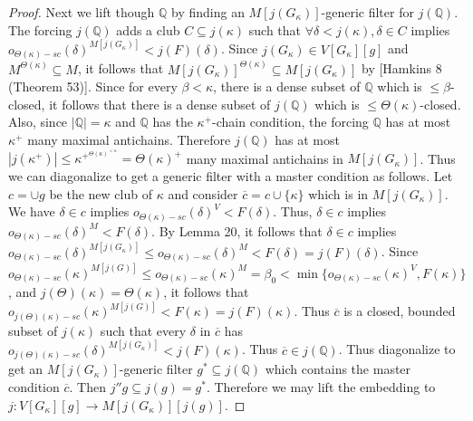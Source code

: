 \documentclass[10pt,a4paper]{amsart}
\begin{document}
\begin{proof}
 Next we lift though $\mathbb{Q}$ by finding an $M[j(G_{\kappa})]$-generic filter for $j(\mathbb{Q})$. The forcing $j(\mathbb{Q})$ adds a club $C \subseteq j(\kappa)$ such that $\forall \delta < j(\kappa), \delta \in C$ implies $o_{\Theta(\kappa)-sc}(\delta)^{M[j(G_{\kappa})]} <j(F)(\delta)$. Since $j(G_{\kappa}) \in V[G_{\kappa}][g]$ and $M^{\Theta(\kappa)} \subseteq M$, it follows that $M[j(G_{\kappa})]^{\Theta(\kappa)} \subseteq M[j(G_{\kappa})]$ by [Hamkins 8 (Theorem 53)]. Since for every $\beta < \kappa$, there is a dense subset of $\mathbb{Q}$ which is $\le \beta$-closed, it follows that there is a dense subset of $j(\mathbb{Q})$ which is $\le \Theta(\kappa)$-closed. Also, since $|\mathbb{Q}| = \kappa$ and $\mathbb{Q}$ has the $\kappa^+$-chain condition, the forcing $\mathbb{Q}$ has at most $\kappa^+$ many maximal antichains. Therefore $j(\mathbb{Q})$ has at most $|j(\kappa^+)| \le \kappa^{+^{\Theta(\kappa)^{<\kappa}}} = \Theta(\kappa)^+$ many maximal antichains in $M[j(G_{\kappa})]$. Thus we can diagonalize to get a generic filter with a master condition as follows. Let $c = \cup g$ be the new club of $\kappa$ and consider $\overline{c} = c \cup \{ \kappa \}$ which is in $M[j(G_{\kappa})]$. We have $\delta \in c$ implies $o_{\Theta(\kappa)-sc}(\delta)^V < F(\delta)$. Thus, $\delta \in c$ implies $o_{\Theta(\kappa)-sc}(\delta)^M < F(\delta)$. By Lemma 20, it follows that $\delta \in c$ implies $o_{\Theta(\kappa)-sc}(\delta)^{M[j(G_{\kappa})]} \le o_{\Theta(\kappa)-sc}(\delta)^M < F(\delta) = j(F)(\delta)$. Since $o_{\Theta(\kappa)-sc}(\kappa)^{M[j(G)]} \le o_{\Theta(\kappa)-sc}(\kappa)^M = \beta_0 < \min\{o_{\Theta(\kappa)-sc}(\kappa)^V, F(\kappa)\}$, and $j(\Theta)(\kappa) = \Theta(\kappa)$, it follows that $o_{j(\Theta)(\kappa)-sc}(\kappa)^{M[j(G)]} < F(\kappa) = j(F)(\kappa)$. Thus $\overline{c}$ is a closed, bounded subset of $j(\kappa)$ such that every $\delta$ in $\overline{c}$ has $o_{j(\Theta)(\kappa)-sc}(\delta)^{M[j(G_{\kappa})]} < j(F)(\kappa)$. Thus $\overline{c} \in j(\mathbb{Q})$. Thus diagonalize to get an $M[j(G_{\kappa})]$-generic filter $g^* \subseteq j(\mathbb{Q})$ which contains the master condition $\overline{c}$. Then $j''g \subseteq j(g) = g^*$. Therefore we may lift the embedding to $j:V[G_{\kappa}][g] \to M[j(G_{\kappa})][j(g)]$.


\end{proof}
\end{document}

